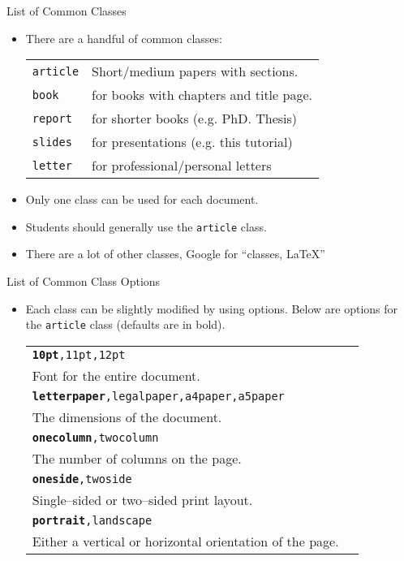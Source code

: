 \documentclass[pdf]{prosper}
\begin{document}
\begin{slide}{List of Common Classes}
	\begin{itemize}
		\item There are a handful of common classes:
			\begin{center}
				\begin{tabular}{l l}
					\texttt{article} & Short/medium papers with sections. \\
					\texttt{book} & for books with chapters and title page. \\
					\texttt{report} & for shorter books (e.g. PhD. Thesis) \\
					\texttt{slides} & for presentations (e.g. this tutorial) \\
					\texttt{letter} & for professional/personal letters \\
				\end{tabular}
			\end{center}
		\item Only one class can be used for each document.
		\item Students should generally use the \texttt{article} class.
		\item There are a lot of other classes, Google for ``classes, LaTeX''
	\end{itemize}
\end{slide}
\begin{slide}{List of Common Class Options}
	\begin{itemize}
		\item Each class can be slightly modified by using options. Below are options for the \texttt{article} class (defaults are in bold).
				\begin{tabular}{l p{2in} l}
					\texttt{\textbf{10pt},11pt,12pt} & \\ 
					\multicolumn{2}{l}{Font for the entire document.} \\
					\texttt{\textbf{letterpaper},legalpaper,a4paper,a5paper} & \\
					\multicolumn{2}{l}{The dimensions of the document.} \\
					\texttt{\textbf{onecolumn},twocolumn} & \\
					\multicolumn{2}{l}{The number of columns on the page.} \\
					\texttt{\textbf{oneside},twoside} & \\
					\multicolumn{2}{l}{Single--sided or two--sided print layout.} \\
					\texttt{\textbf{portrait},landscape} & \\
					\multicolumn{2}{l}{Either a vertical or horizontal orientation of the page.} \\
				\end{tabular}
	\end{itemize}
\end{slide}
\end{document}
